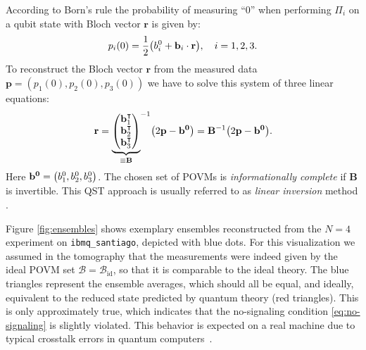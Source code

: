 \documentclass[aps,pra,twocolumn,superscriptaddress,showemail,showpacs,longbibliography]{revtex4-2}
\renewcommand{\vec}{\mathbf}
\begin{document}
According to Born's rule the probability of measuring ``0'' when performing $\Pi_i$ on a qubit state with Bloch vector $\vec r$ is given by:
\begin{equation}
    \label{eq:meas_prob}
    p_i(0) = \frac{1}{2} \qty(b^0_i + \vec b_i \cdot \vec r) \qc i = 1,2,3.
\end{equation}
To reconstruct the Bloch vector $\vec r$ from the measured data $\vec p = (p_1(0),p_2(0),p_3(0))$ we have to solve this system of three linear equations:
\begin{equation}
    \vec r = {\underbrace{\mqty(\vec{b}_1^\intercal \\ \vec{b}_2^\intercal \\ \vec{b}_3^\intercal)}_{\equiv \mathbf{B}}}^{-1} \qty(2 \vec p - \vec{b^0}) = \mathbf{B}^{-1} \qty(2 \vec p - \vec{b^0}).
\end{equation}
Here $\vec{b^0} = \qty(b^0_1, b^0_2, b^0_3)$. The chosen set of POVMs is \emph{informationally complete} if $\mathbf{B}$ is invertible.
This QST approach is usually referred to as \emph{linear inversion} method \cite{GutaFast-state-tomography2020, DArianoOptimal-Data-Processing2007}.

Figure \ref{fig:ensembles} shows exemplary ensembles reconstructed from the $N=4$ experiment on \texttt{ibmq\_santiago}, depicted with blue dots. For this visualization we assumed in the tomography that the measurements were indeed given by the ideal POVM set $\mathcal{B} = \mathcal{B}_\text{id}$, so that it is comparable to the ideal theory. The blue triangles represent the ensemble averages, which should all be equal, and ideally, equivalent to the reduced state predicted by quantum theory (red triangles). This is only approximately true, which indicates that the no-signaling condition \eqref{eq:no-signaling} is slightly violated. This behavior is expected on a real machine due to typical crosstalk errors in quantum computers~\cite{SarovarDetectingcrosstalkerrors2020}.  
\end{document}
